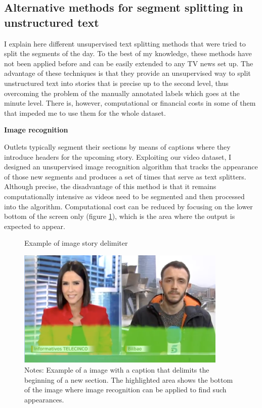 \documentclass[12pt]{article}
\begin{document}
	
	
	
	
	\subsection{Alternative methods for segment splitting in unstructured text}
	
	I explain here different unsupervised text splitting methods that were tried to split the segments of the day. To the best of my knowledge, these methods have not been applied before and can be easily extended to any TV news set up. The advantage of these techniques is that they provide an unsupervised way to split unstructured text into stories that is precise up to the second level, thus overcoming the problem of the manually annotated labels which goes at the minute level. There is, however, computational or financial costs in some of them that impeded me to use them for the whole dataset.
	
	\textbf{Image recognition}
	
	Outlets typically segment their sections by means of captions where they introduce headers for the upcoming story. Exploiting our video dataset, I designed an unsupervised image recognition algorithm that tracks the appearance of those new segments and produces a set of times that serve as text splitters. Although precise, the disadvantage of this method is that it remains computationally intensive as videos need to be segmented and then processed into the algorithm. Computational cost can be reduced by focusing on the lower bottom of the screen  only (figure \ref{figure:image_rec}), which is the area where the output is expected to appear.
	
	\begin{figure}[H]
		\centering
		\caption{Example of  image story delimiter}
		\includegraphics[width=100mm]{figures/image_recog}
		
		\caption*{\small Notes: Example of a image with a caption that delimits the beginning of a new section. The highlighted area shows the bottom of the image where image recognition can be applied to find such appearances.}
			\label{figure:image_rec}
	\end{figure} 
	
\end{document}
